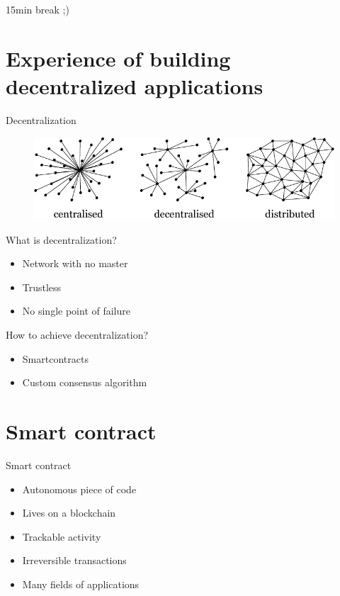 \documentclass[12pt]{beamer}
\begin{document}
  \begin{frame}[standout]
    15min break ;)
  \end{frame}

  \section{Experience of building decentralized applications}

  \begin{frame}{Decentralization}
    \begin{figure}
      \includegraphics[height=.35\textheight]{images/centralised-decentralised-distributed}
    \end{figure}
  \end{frame}

  \begin{frame}{What is decentralization?}
    \begin{itemize}
      \item Network with \alert{no master}
      \item \alert{Trustless}
      \item No single point of failure
    \end{itemize}
  \end{frame}


  \begin{frame}{How to achieve decentralization?}
    \begin{itemize}
      \item \alert{Smartcontracts}
      \item Custom \alert{consensus} algorithm
    \end{itemize}
  \end{frame}




  \section{Smart contract}

  \begin{frame}{Smart contract}
    \begin{itemize}
      \item \alert{Autonomous} piece of code
      \item Lives on a \alert{blockchain}
      \item \alert{Trackable} activity
      \item \alert{Irreversible} transactions
      \item Many fields of applications
    \end{itemize}
  \end{frame}
\end{document}
